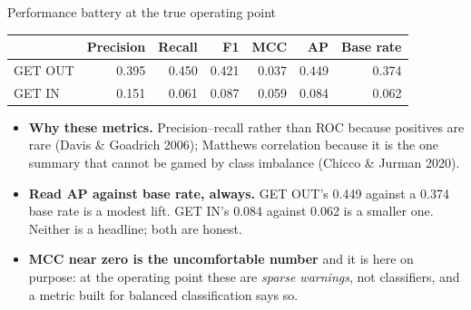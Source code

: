 \documentclass[aspectratio=169,11pt]{beamer}
\begin{document}
\begin{frame}{Performance battery at the true operating point}
  \small
  \begin{table}
    \begin{tabular}{@{}lrrrrrr@{}}
      \toprule
      & \textbf{Precision} & \textbf{Recall} & \textbf{F1} & \textbf{MCC}
      & \textbf{AP} & \textbf{Base rate} \\
      \midrule
      GET OUT & 0.395 & 0.450 & 0.421 & 0.037 & 0.449 & 0.374 \\
      GET IN  & 0.151 & 0.061 & 0.087 & 0.059 & 0.084 & 0.062 \\
      \bottomrule
    \end{tabular}
  \end{table}
  \vspace{0.4em}
  \begin{itemize}\footnotesize
    \item \textbf{Why these metrics.} Precision--recall rather than ROC
      because positives are rare (Davis \& Goadrich 2006); Matthews
      correlation because it is the one summary that cannot be gamed by class
      imbalance (Chicco \& Jurman 2020).
    \item \textbf{Read AP against base rate, always.} GET OUT's 0.449 against
      a 0.374 base rate is a modest lift. GET IN's 0.084 against 0.062 is a
      smaller one. Neither is a headline; both are honest.
    \item \textbf{MCC near zero is the uncomfortable number} and it is here on
      purpose: at the operating point these are \emph{sparse warnings}, not
      classifiers, and a metric built for balanced classification says so.
  \end{itemize}
\end{frame}

\end{document}
